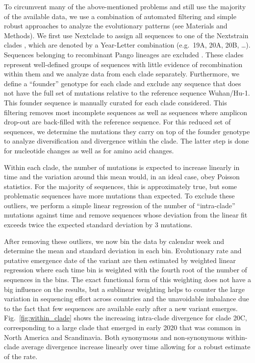 \documentclass[aps,rmp, twocolumn]{revtex4}
\begin{document}
To circumvent many of the above-mentioned problems and still use the majority of the available data, we use a combination of automated filtering and simple robust approaches to analyze the evolutionary patterns (see Materials and Methods).
We first use Nextclade \citep{aksamentov_nextclade_2021} to assign all sequences to one of the Nextstrain clades \citep{hadfield_nextstrain_2018}, which are denoted by a Year-Letter combination (e.g.~19A, 20A, 20B, \ldots).
Sequences belonging to recombinant Pango lineages are excluded \citep{rambaut_dynamic_2020}.
These clades represent well-defined groups of sequences with little evidence of recombination within them and we analyze data from each clade separately.
Furthermore, we define a ``founder'' genotype for each clade and exclude any sequence that does not have the full set of mutations relative to the reference sequence Wuhan/Hu-1.
This founder sequence is manually curated for each clade considered.
This filtering removes most incomplete sequences as well as sequences where amplicon drop-out are back-filled with the reference sequence.
For this reduced set of sequences, we determine the mutations they carry on top of the founder genotype to analyze diversification and divergence within the clade.
The latter step is done for nucleotide changes as well as for amino acid changes.

Within each clade, the number of mutations is expected to increase linearly in time and the variation around this mean would, in an ideal case, obey Poisson statistics.
For the majority of sequences, this is approximately true, but some problematic sequences have more mutations than expected.
To exclude these outliers, we perform a simple linear regression of the number of ``intra-clade'' mutations against time and remove sequences whose deviation from the linear fit exceeds twice the expected standard deviation by 3 mutations.


After removing these outliers, we now bin the data by calendar week and determine the mean and standard deviation in each bin.
Evolutionary rate and putative emergence date of the variant are then estimated by weighted linear regression where each time bin is weighted with the fourth root of the number of sequences in the bins.
The exact functional form of this weighting does not have a big influence on the results, but a sublinear weighting helps to counter the large variation in sequencing effort across countries and the unavoidable imbalance due to the fact that few sequences are available early after a new variant emerges.
Fig.~\ref{fig:within_clade} shows the increasing intra-clade divergence for clade 20C, corresponding to a large clade that emerged in early 2020 that was common in North America and Scandinavia.
Both synonymous and non-synonymous within-clade average divergence increase linearly over time allowing for a robust estimate of the rate.
\end{document}
